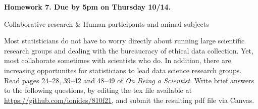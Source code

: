 \documentclass[12pt]{article}
\begin{document}
\begin{center}\bf
Homework 7. Due by 5pm on Thursday 10/14.

Collaborative research \& Human participants and animal subjects

\end{center}
Most statisticians do not have to worry directly about running large scientific research groups and dealing with the bureaucracy of ethical data collection. Yet, most collaborate sometimes with scientists who do. In addition, there are increasing opportunites for statisticians to lead data science research groups. Read pages 24--28, 39--42 and 48--49 of {\em On Being a Scientist}.  Write brief answers to the following questions, by editing the tex file available at \url{https://github.com/ionides/810f21}, and submit the resulting pdf file via Canvas.
\end{document}
